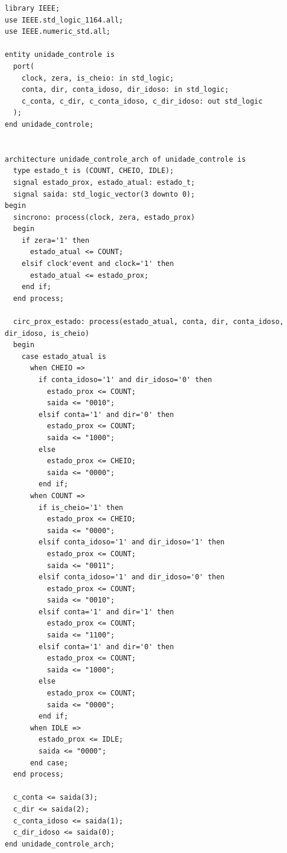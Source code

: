 \documentclass[a4,12pt]{horizon-theme}
\newenvironment{code}{\captionsetup{type=listing}}{}
\begin{document}
\newpage
\begin{code}
\label{lst:uc}
\begin{verbatim}
library IEEE;
use IEEE.std_logic_1164.all;
use IEEE.numeric_std.all;

entity unidade_controle is
  port(
    clock, zera, is_cheio: in std_logic;
    conta, dir, conta_idoso, dir_idoso: in std_logic;
    c_conta, c_dir, c_conta_idoso, c_dir_idoso: out std_logic
  );
end unidade_controle;


architecture unidade_controle_arch of unidade_controle is
  type estado_t is (COUNT, CHEIO, IDLE);
  signal estado_prox, estado_atual: estado_t;
  signal saida: std_logic_vector(3 downto 0);
begin
  sincrono: process(clock, zera, estado_prox)
  begin
    if zera='1' then
      estado_atual <= COUNT;
    elsif clock'event and clock='1' then
      estado_atual <= estado_prox;
    end if;
  end process;

  circ_prox_estado: process(estado_atual, conta, dir, conta_idoso, dir_idoso, is_cheio)
  begin
    case estado_atual is
      when CHEIO =>
        if conta_idoso='1' and dir_idoso='0' then
          estado_prox <= COUNT;
          saida <= "0010";
        elsif conta='1' and dir='0' then
          estado_prox <= COUNT;
          saida <= "1000";
        else
          estado_prox <= CHEIO;
          saida <= "0000";
        end if;
      when COUNT =>
        if is_cheio='1' then
          estado_prox <= CHEIO;
          saida <= "0000";
        elsif conta_idoso='1' and dir_idoso='1' then
          estado_prox <= COUNT;
          saida <= "0011";
        elsif conta_idoso='1' and dir_idoso='0' then
          estado_prox <= COUNT;
          saida <= "0010";
        elsif conta='1' and dir='1' then
          estado_prox <= COUNT;
          saida <= "1100";
        elsif conta='1' and dir='0' then
          estado_prox <= COUNT;
          saida <= "1000";
        else
          estado_prox <= COUNT;
          saida <= "0000";
        end if;
      when IDLE =>
        estado_prox <= IDLE;
        saida <= "0000";
      end case;
  end process;

  c_conta <= saida(3);
  c_dir <= saida(2);
  c_conta_idoso <= saida(1);
  c_dir_idoso <= saida(0);
end unidade_controle_arch;
\end{verbatim}
\end{code}


% 
% 

\horizonBackCover
\end{document}
